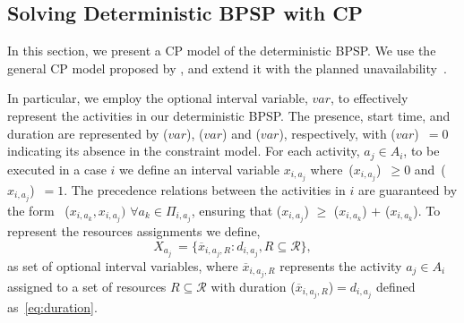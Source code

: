 
\subsection{Solving Deterministic BPSP with CP}

In this section, we present a CP model of the 
deterministic BPSP. We use the general CP model
proposed by \cite{senderovich2019learning}, 
and extend it with the planned unavailability~\cite{hauder2020resource}.

In particular, we employ the optional interval variable, $var$, to effectively represent the activities in our deterministic BPSP. The presence, start time, and duration are represented by ($var$), ($var$) and 
($var$), respectively, with ($var$)~$=0$ indicating
its absence in the constraint model.
For each activity, $a_j \in A_i$, to be executed in a case $i$ we define an interval variable $x_{i,a_{j}}$ where~($x_{i,a_{j}}$)~$\geq 0$ and~($x_{i,a_{j}}$)~$= 1$. The precedence relations between the activities in $i$ are guaranteed by the form ~($x_{i,a_{k}},x_{i,a_{j}})$ $ \forall a_k \in \Pi_{i,a_j}$, ensuring that ($x_{i,a_{j}}$) $\geq$ ($x_{i,a_{k}}$) $+$ ($x_{i,a_{k}}$). %
To represent the resources assignments we define, $$X_{a_j}~=\{\overline{x}_{i,a_j,R}: d_{i,a_j},R \subseteq \mathcal{R}\},$$ as set of optional interval variables, where $\overline{x}_{i,a_j,R}$ represents the activity $a_{j} \in A_i$ assigned to a set of resources $R \subseteq \mathcal{R}$ with duration ($\overline{x}_{i,a_j,R}$)$= d_{i,a_j}$ defined as~\eqref{eq:duration}.


